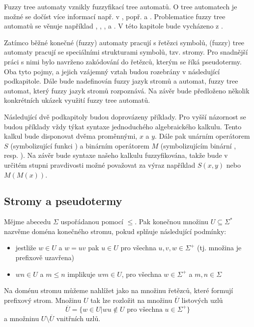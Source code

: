 \documentclass[a4paper,10pt]{article}
\begin{document}
Fuzzy tree automaty vznikly fuzzyfikací  tree automatů. O  tree automatech je možné se dočíst více informací např. v \cite{Com+-TreeAutTecApp}, popř. \cite{Hua-SyntPattRecSeisOilExp} a \cite{Bez+-FuzModAlgPatRecImProc}. Problematice fuzzy tree automatů se věnuje například \cite{Lee-FuzTreAutSynPatRec}, \cite{MogZadAme-NewDirInFuzzTreeAut}, \cite{ChaJos-NoteFuzzTreeAut}, \cite{EsiLiu-FuzzTreeAut} a \cite{MorMal-FuzzyAutLang}. V této kapitole bude vycházeno z \cite{MorMal-FuzzyAutLang}.

Zatímco běžné konečné (fuzzy) automaty pracují s řetězci symbolů, (fuzzy) tree automaty pracují se speciálními strukturami symbolů, tzv. stromy. Pro snadnější práci s nimi bylo navrženo zakódování do řetězců, kterým se říká pseudotermy. Oba tyto pojmy, a jejich vzájemný vztah budou rozebrány v následující podkapitole. Dále bude nadefinován fuzzy jazyk stromů a automat, fuzzy tree automat, který fuzzy jazyk stromů rozpoznává. Na závěr bude předloženo několik konkrétních ukázek využití fuzzy tree automatů.

Následující dvě podkapitoly budou doprovázeny příklady. Pro vyšší názornost se budou příklady vždy týkat syntaxe jednoduchého algebraického kalkulu. Tento kalkul bude disponovat dvěma proměnnými, $x$ a $y$. Dále pak unárním operátorem $S$ (symbolizující funkci ) a binárním operátorem $M$ (symbolizujícím binární , resp. ). Na závěr bude syntaxe našeho kalkulu fuzzyfikována, takže bude v určitém stupni pravdivosti možné považovat za výraz například $S(x, y)$ nebo $M(M(x))$.

\subsection{Stromy a pseudotermy}

\begin{definition}
  Mějme abecedu $\Sigma$ uspořádanou pomocí $\leq$. Pak konečnou množinu $U \subseteq \Sigma^*$ nazvěme doména konečného stromu, pokud splňuje následující podmínky:
  \begin{itemize}
   \item jestliže $w \in U$ a $w = uv$ pak $u \in U$ pro všechna $u, v, w \in \Sigma^+$ (tj. množina je prefixově uzavřena)
   \item $wn \in U$ a $m \leq n$ implikuje $wm \in U$, pro všechna $w \in \Sigma^+$ a $m, n \in \Sigma$
  \end{itemize}
\end{definition}
 Na doménu stromu můžeme nahlížet jako na množinu řetězců, které formují prefixový strom. Množinu $U$ tak lze rozložit na množinu $\overline{U}$ listových uzlů 
$$
 \overline{U} = \{ w \in U | w u \notin U \text{ pro všechna } u \in \Sigma^+ \}
$$
a množninu $U \setminus \overline{U}$ vnitřních uzlů.
\end{document}

